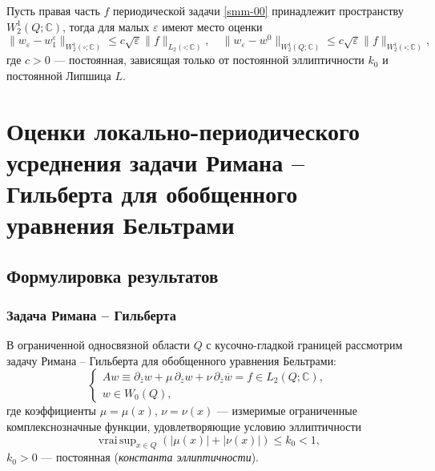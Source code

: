\begin{theorem}\label{smm-th1.8}
Пусть правая часть $f$ периодической задачи \eqref{smm-00} принадлежит пространству $W_2^1(Q;\mathbb{C})$, тогда для малых $\varepsilon$ имеют место оценки
	\begin{equation*}
		\|w_\varepsilon-w_1^\varepsilon\|_{W_2^1 (\square; \mathbb{C})}\leqslant c\sqrt{\varepsilon}\|f
		\|_{L_2 (\square; \mathbb{C})}, \quad \|w_\varepsilon-w^0\|_{W_2^1 (Q; \mathbb{C})}\leqslant c\sqrt{\varepsilon}\|f
		\|_{W_2^1 (\square; \mathbb{C})},
	\end{equation*}
	где $c>0$ --- постоянная, зависящая только от постоянной эллиптичности $k_0$ и постоянной Липшица $L$.
\end{theorem}

\section{Оценки локально-периодического усреднения задачи Римана -- Гильберта для обобщенного уравнения Бельтрами}


\subsection{Формулировка результатов}


\subsubsection{Задача Римана -- Гильберта}

В ограниченной односвязной области $Q$ с кусочно-гладкой границей рассмотрим задачу Римана -- Гильберта для обобщенного уравнения Бельтрами:
\begin{equation}\label{smm-0sirazhf:1.1}
	\left\{\begin{array}{l}
		A w\equiv\partial_{\bar{z}}w+\mu\,\partial_z w+\nu\,\partial_{\bar z}\overline{w}=f\in L_2(Q;\mathbb{C}), \\[3mm]
		w\in W_0(Q),
	\end{array}\right.
\end{equation}
где коэффициенты $\mu=\mu(x)$, $\nu=\nu(x)$ --- измеримые ограниченные комплекснозначные функции, удовлетворяющие условию эллиптичности
\begin{equation}\label{smm-00sirazhf:1.2}
	\mathop{vrai\,sup}_{x\in Q}\left(|\mu(x)|+|\nu(x)|\right)\leqslant k_0 <1,
\end{equation}
$k_0>0$ --- постоянная (\textit{константа эллиптичности}).

